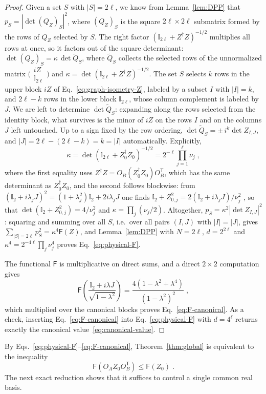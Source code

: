 \documentclass[prx,twocolumn,superscriptaddress,aps,10pt, frontmatterverbose, reprint,footinbib,longbibliography=true]{revtex4-2}
\newcommand{\trans}{\mathsf{T}}
\begin{document}
\begin{proof}
Given a set $S$ with $|S|=2\ell$, we know from Lemma~\ref{lem:DPP} that $p_S=|\det(Q_Z)_S|^2$, where $(Q_Z)_S$ is the square $2\ell\times2\ell$ submatrix formed by the rows of $Q_Z$ selected by $S$. The right factor $(\mathbb{I}_{2\ell}+Z^\dagger Z)^{-1/2}$ multiplies all rows at once, so it factors out of the square determinant: $\det(Q_Z)_S=\kappa\,\det\widetilde{Q}_S$, where $\widetilde{Q}_S$ collects the selected rows of the unnormalized matrix $\big(\begin{smallmatrix}iZ\\ \mathbb{I}_{2\ell}\end{smallmatrix}\big)$ and $\kappa=\det(\mathbb{I}_{2\ell}+Z^\dagger Z)^{-1/2}$. 
The set $S$ selects $k$ rows in the upper block $iZ$ of Eq.~\eqref{eq:graph-isometry-Z}, labeled by a subset $I$ with $|I|=k$, and $2\ell-k$ rows in the lower block $\mathbb{I}_{2\ell}$, whose column complement is labeled by $J$.
We are left to determine $\det\widetilde{Q}_S$: expanding along the rows selected from the identity block, what survives is the minor of $iZ$ on the rows $I$ and on the columns $J$ left untouched. Up to a sign fixed by the row ordering, $\det\widetilde{Q}_S=\pm\,i^k\det Z_{I,J}$, and $|J|=2\ell-(2\ell-k)=k=|I|$ automatically. Explicitly,
\begin{equation}
    \kappa=\det\!\left(\mathbb{I}_{2\ell}+Z_0^\dagger Z_0\right)^{-1/2}=2^{-\ell}\prod_{j=1}^{\ell}\nu_j\;,
    \label{eq:kappa}
\end{equation}
where the first equality uses $Z^\dagger Z=O_B(Z_0^\dagger Z_0)O_B^{\trans}$, which has the same determinant as $Z_0^\dagger Z_0$, and the second follows blockwise: from $(\mathbb{I}_2+i\lambda_jJ)^2=(1+\lambda_j^2)\mathbb{I}_2+2i\lambda_jJ$ one finds $\mathbb{I}_2+Z_{0,j}^2=2(\mathbb{I}_2+i\lambda_jJ)/\nu_j^2$ , so that $\det(\mathbb{I}_2+Z_{0,j}^2)=4/\nu_j^2$ and $\kappa=\prod_{j}(\nu_j/2)$. Altogether, $p_S=\kappa^2|\det Z_{I,J}|^2$: squaring and summing over all $S$, i.e.\ over all pairs $(I,J)$ with $|I|=|J|$, gives $\sum_{|S|=2\ell}p_S^2=\kappa^4\mathsf{F}(Z)$, and Lemma~\ref{lem:DPP} with $N=2\ell$, $d=2^{2\ell}$ and $\kappa^4=2^{-4\ell}\prod_j\nu_j^4$ proves Eq.~\eqref{eq:physical-F}.

The functional $\mathsf{F}$ is multiplicative on direct sums, and a direct $2\times2$ computation gives
\begin{equation}
    \mathsf{F}\!\left(\frac{\mathbb{I}_2+i\lambda J}{\sqrt{1-\lambda^2}}\right)=\frac{4\left(1-\lambda^2+\lambda^4\right)}{(1-\lambda^2)^2}\;,
    \label{eq:F_Z_0}
\end{equation}
which multiplied over the canonical blocks proves Eq.~\eqref{eq:F-canonical}. As a check, inserting Eq.~\eqref{eq:F-canonical} into Eq.~\eqref{eq:physical-F} with $d=4^{\ell}$ returns exactly the canonical value~\eqref{eq:canonical-value}.
\end{proof}
By Eqs.~\eqref{eq:physical-F}--\eqref{eq:F-canonical}, Theorem~\ref{thm:global} is equivalent to the inequality
\begin{equation}
    \mathsf{F}(O_AZ_0O_B^{\trans})\le \mathsf{F}(Z_0)\;.
    \label{eq:Cartan-target}
\end{equation}
The next exact reduction shows that it suffices to control a single common real basis.
\end{document}
